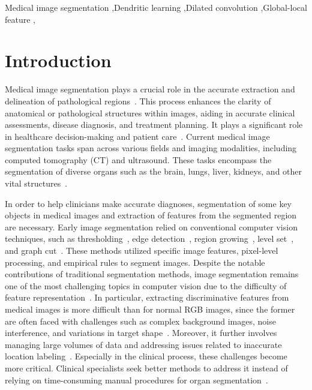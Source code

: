 \documentclass[review]{elsarticle}
\begin{document}
\begin{frontmatter}
\begin{abstract}
		\end{abstract}
		
		\begin{keyword}
			Medical image segmentation \sep Dendritic learning \sep  Dilated convolution \sep Global-local feature \sep
		\end{keyword}
		
	\end{frontmatter}
	
	\section{Introduction}
	Medical image segmentation plays a crucial role in the accurate extraction and delineation of pathological regions~\cite{iglesias2015multi}. This process enhances the clarity of anatomical or pathological structures within images, aiding in accurate clinical assessments, disease diagnosis, and treatment planning. It plays a significant role in healthcare decision-making and patient care~\cite{duncan2000Medical}. Current medical image segmentation tasks span across various fields and imaging modalities, including computed tomography (CT) and ultrasound. These tasks encompass the segmentation of diverse organs such as the brain, lungs, liver, kidneys, and other vital structures~\cite{shen2017deep,salpea2022medical,antonelli2022medical}.

	In order to help clinicians make accurate diagnoses, segmentation of some key objects in medical images and extraction of features from the segmented region are necessary. Early image segmentation relied on conventional computer vision techniques, such as thresholding~\cite{zhang2006adaptive, senthilkumaran2016image}, edge detection~\cite{chalana1997methodology,mehena2013medical}, region growing~\cite{justice1997medical}, level set~\cite{li2012new}, and graph cut~\cite{boykov2006graph,manoharan2020improved}. These methods utilized specific image features, pixel-level processing, and empirical rules to segment images. Despite the notable contributions of traditional segmentation methods, image segmentation remains one of the most challenging topics in computer vision due to the difficulty of feature representation~\cite{wang2022medical}. In particular, extracting discriminative features from medical images is more difficult than for normal RGB images, since the former are often faced with challenges such as complex background images, noise interference, and variations in target shape~\cite{pham2000current}. Moreover, it further involves managing large volumes of data and addressing issues related to inaccurate location labeling~\cite{hesamian2019deep,scholl2011challenges}. Especially in the clinical process, these challenges become more critical. Clinical specialists seek better methods to address it instead of relying on time-consuming manual procedures for organ segmentation~\cite{mccrindle2021radiology}.
\end{document}
